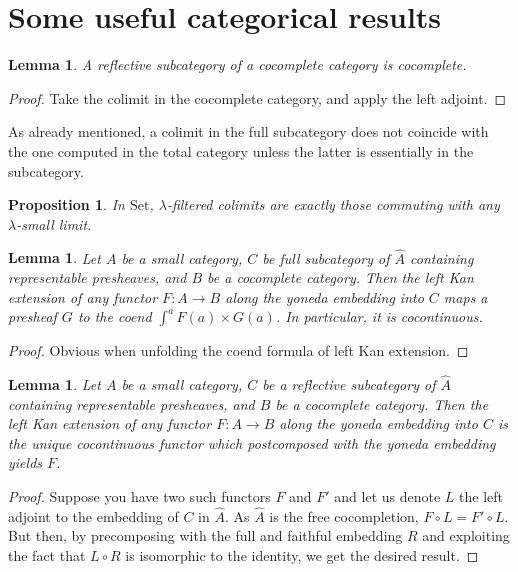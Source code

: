 \documentclass{article}
\newcommand{\Set}{\text{Set}}
\newtheorem{proposition}[theorem]{Proposition}
\newtheorem{lemma}[theorem]{Lemma}
\begin{document}
\section{Some useful categorical results}
\begin{lemma}
  \label{l:reflect-cocomplete}
  A reflective subcategory of a cocomplete category is cocomplete. 
\end{lemma}
\begin{proof}
  Take the colimit in the cocomplete category, and apply the left adjoint.
\end{proof}
As already mentioned, a colimit in the full subcategory does not coincide with the
one computed in the total category unless the latter is essentially in the subcategory.
\begin{proposition}
 In $\Set$, $\lambda$-filtered colimits are exactly those commuting with any $\lambda$-small limit.
\end{proposition}
\begin{lemma}
\label{l:cocontinuous-lkan}
 Let $A$  be a small category, $C$ be full subcategory of $\hat{A}$
 containing representable presheaves, and $B$ be a cocomplete category.
 Then the left Kan extension of any functor $F : A\rightarrow B$ along the
 yoneda embedding into $C$ maps a presheaf $G$ to the coend $\int^a F(a)\times
 G(a)$.
 In particular, it is cocontinuous.
\end{lemma}
\begin{proof}
 Obvious when unfolding the coend formula of left Kan extension. 
\end{proof}
\begin{lemma}
  \label{l:unique-cocontinuous-lkan}
  Let $A$  be a small category, $C$ be a reflective subcategory of $\hat{A}$
  containing representable presheaves, and $B$ be a cocomplete category.
  Then the left Kan extension of any functor $F : A\rightarrow B$ along the
  yoneda embedding into $C$ is the unique cocontinuous functor which
  postcomposed with the yoneda embedding yields $F$.
\end{lemma}
\begin{proof}
  Suppose you have two such functors $F$ and $F'$ and let us denote $L$ the left
  adjoint to the embedding of $C$ in $\hat{A}$. 
  As $\hat{A}$ is the free cocompletion, $F\circ L = F'\circ L$. But then, by
  precomposing with the full and faithful embedding $R$ and exploiting the fact
  that $L\circ R$ is isomorphic to the identity, we get the desired result.
\end{proof}


\end{document}
